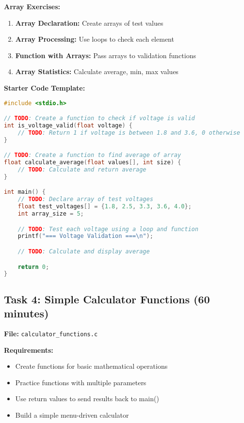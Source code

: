 \documentclass[11pt,a4paper]{article}
\begin{document}
\textbf{Array Exercises:}
\begin{enumerate}
    \item \textbf{Array Declaration:} Create arrays of test values
    \item \textbf{Array Processing:} Use loops to check each element
    \item \textbf{Function with Arrays:} Pass arrays to validation functions
    \item \textbf{Array Statistics:} Calculate average, min, max values
\end{enumerate}

\textbf{Starter Code Template:}
\begin{lstlisting}[language=C]
#include <stdio.h>

// TODO: Create a function to check if voltage is valid
int is_voltage_valid(float voltage) {
    // TODO: Return 1 if voltage is between 1.8 and 3.6, 0 otherwise
}

// TODO: Create a function to find average of array
float calculate_average(float values[], int size) {
    // TODO: Calculate and return average
}

int main() {
    // TODO: Declare array of test voltages
    float test_voltages[] = {1.8, 2.5, 3.3, 3.6, 4.0};
    int array_size = 5;

    // TODO: Test each voltage using a loop and function
    printf("=== Voltage Validation ===\n");

    // TODO: Calculate and display average

    return 0;
}
\end{lstlisting}

\subsection{Task 4: Simple Calculator Functions (60 minutes)}

\textbf{File:} \texttt{calculator\_functions.c}

\textbf{Requirements:}
\begin{itemize}
    \item Create functions for basic mathematical operations
    \item Practice functions with multiple parameters
    \item Use return values to send results back to main()
    \item Build a simple menu-driven calculator
\end{itemize}
\end{document}
